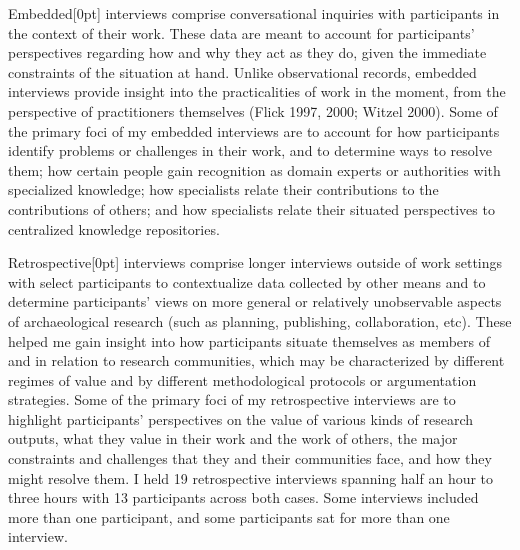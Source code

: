 \documentclass[
]{article}
\newcommand{\paragraphnumber}[1]{\marginnote{\color{lightgray}\tiny{#1}}[0pt]}
\begin{document}
Embedded\paragraphnumber{[33]} interviews comprise conversational
inquiries with participants in the context of their work. These data are
meant to account for participants' perspectives regarding how and why
they act as they do, given the immediate constraints of the situation at
hand. Unlike observational records, embedded interviews provide insight
into the practicalities of work in the moment, from the perspective of
practitioners themselves (Flick 1997, 2000; Witzel 2000). Some of the
primary foci of my embedded interviews are to account for how
participants identify problems or challenges in their work, and to
determine ways to resolve them; how certain people gain recognition as
domain experts or authorities with specialized knowledge; how
specialists relate their contributions to the contributions of others;
and how specialists relate their situated perspectives to centralized
knowledge repositories.

Retrospective\paragraphnumber{[34]} interviews comprise longer
interviews outside of work settings with select participants to
contextualize data collected by other means and to determine
participants' views on more general or relatively unobservable aspects
of archaeological research (such as planning, publishing, collaboration,
etc). These helped me gain insight into how participants situate
themselves as members of and in relation to research communities, which
may be characterized by different regimes of value and by different
methodological protocols or argumentation strategies. Some of the
primary foci of my retrospective interviews are to highlight
participants' perspectives on the value of various kinds of research
outputs, what they value in their work and the work of others, the major
constraints and challenges that they and their communities face, and how
they might resolve them. I held 19 retrospective interviews spanning
half an hour to three hours with 13 participants across both cases. Some
interviews included more than one participant, and some participants sat
for more than one interview.
\end{document}

